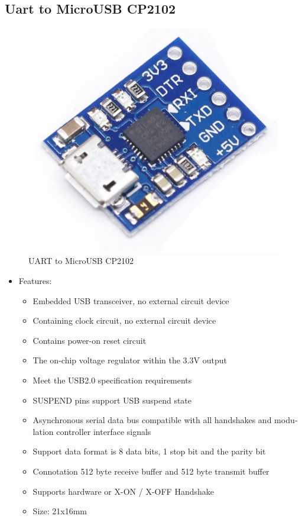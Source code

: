\documentclass[D:/Latex/Internship/Report/Latex/Report.tex]{subfiles}
\begin{document}
\begin{otherlanguage}{english}
		\subsection{Uart to MicroUSB CP2102}
			\begin{figure}[!ht]
				\centering
				\includegraphics[width = 0.5\linewidth]{Figure/CP2102.pdf}
				\caption{UART to MicroUSB CP2102}
			\end{figure}
			\begin{itemize}
				\item Features:
					\begin{itemize}
						\item Embedded USB transceiver, no external circuit device
						\item Containing clock circuit, no external circuit device
						\item Contains power-on reset circuit
						\item The on-chip voltage regulator within the 3.3V output
						\item Meet the USB2.0 specification requirements
						\item SUSPEND pins support USB suspend state
						\item Asynchronous serial data bus compatible with all handshakes and modulation controller interface signals
						\item Support data format is 8 data bits, 1 stop bit and the parity bit
						\item Connotation 512 byte receive buffer and 512 byte transmit buffer
						\item Supports hardware or X-ON / X-OFF Handshake
						\item Size: 21x16mm
					\end{itemize}
			\end{itemize}
	\end{otherlanguage}
\end{document}
